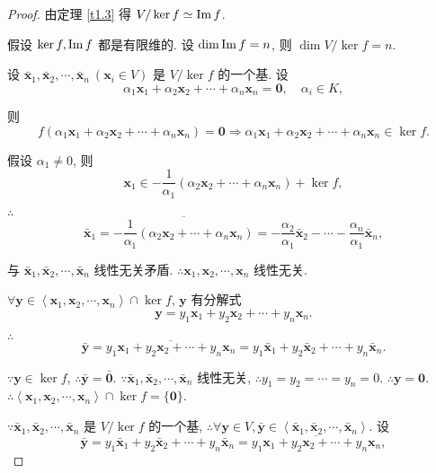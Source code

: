 \documentclass[color=black,device=normal,lang=cn,mode=geye]{elegantnote}
\begin{document}
\begin{proof}
    由定理 \ref{t1.3} 得 $V/\ker f\simeq\operatorname{Im} f$.

    假设 $\ker f,\operatorname{Im} f$ 都是有限维的. 设 $\dim\operatorname{Im} f=n$, 则 $\dim V/\ker f=n$.
    
    设 $\bar{\boldsymbol{x}}_1,\bar{\boldsymbol{x}}_2,\cdots,\bar{\boldsymbol{x}}_n\ (\boldsymbol{x}_i\in V)$ 是 $V/\ker f$ 的一个基. 设
    \[\alpha_1\boldsymbol{x}_1+\alpha_2\boldsymbol{x}_2+\cdots+\alpha_n\boldsymbol{x}_n=\boldsymbol{0},\quad\alpha_i\in K,\]

    则
    \[f(\alpha_1\boldsymbol{x}_1+\alpha_2\boldsymbol{x}_2+\cdots+\alpha_n\boldsymbol{x}_n)=\boldsymbol{0}\Rightarrow\alpha_1\boldsymbol{x}_1+\alpha_2\boldsymbol{x}_2+\cdots+\alpha_n\boldsymbol{x}_n\in\ker f.\]

    假设 $\alpha_1\neq0$, 则
    \[\boldsymbol{x}_1\in-\dfrac{1}{\alpha_1}(\alpha_2\boldsymbol{x}_2+\cdots+\alpha_n\boldsymbol{x}_n)+\ker f,\]

    $\therefore$
    \[\bar{\boldsymbol{x}}_1=\overline{-\dfrac{1}{\alpha_1}(\alpha_2\boldsymbol{x}_2+\cdots+\alpha_n\boldsymbol{x}_n)}=-\dfrac{\alpha_2}{\alpha_1}\bar{\boldsymbol{x}}_2-\cdots-\dfrac{\alpha_n}{\alpha_1}\bar{\boldsymbol{x}}_n,\]

    与 $\bar{\boldsymbol{x}}_1,\bar{\boldsymbol{x}}_2,\cdots,\bar{\boldsymbol{x}}_n$ 线性无关矛盾. $\therefore\boldsymbol{x}_1,\boldsymbol{x}_2,\cdots,\boldsymbol{x}_n$ 线性无关.

    $\forall\boldsymbol{y}\in\left<\boldsymbol{x}_1,\boldsymbol{x}_2,\cdots,\boldsymbol{x}_n\right>\cap\ker f$, $\boldsymbol{y}$ 有分解式
    \[\boldsymbol{y}=y_1\boldsymbol{x}_1+y_2\boldsymbol{x}_2+\cdots+y_n\boldsymbol{x}_n.\]

    $\therefore$
    \[\bar{\boldsymbol{y}}=\overline{y_1\boldsymbol{x}_1+y_2\boldsymbol{x}_2+\cdots+y_n\boldsymbol{x}_n}=y_1\bar{\boldsymbol{x}}_1+y_2\bar{\boldsymbol{x}}_2+\cdots+y_n\bar{\boldsymbol{x}}_n.\]

    $\because\boldsymbol{y}\in\ker f$, $\therefore\bar{\boldsymbol{y}}=\bar{\boldsymbol{0}}$. $\because\bar{\boldsymbol{x}}_1,\bar{\boldsymbol{x}}_2,\cdots,\bar{\boldsymbol{x}}_n$ 线性无关, $\therefore y_1=y_2=\cdots=y_n=0$. $\therefore\boldsymbol{y}=\boldsymbol{0}$. $\therefore\left<\boldsymbol{x}_1,\boldsymbol{x}_2,\cdots,\boldsymbol{x}_n\right>\cap\ker f=\{\boldsymbol{0}\}$.

    $\because\bar{\boldsymbol{x}}_1,\bar{\boldsymbol{x}}_2,\cdots,\bar{\boldsymbol{x}}_n$ 是 $V/\ker f$ 的一个基, $\therefore\forall\boldsymbol{y}\in V,\bar{\boldsymbol{y}}\in\left<\bar{\boldsymbol{x}}_1,\bar{\boldsymbol{x}}_2,\cdots,\bar{\boldsymbol{x}}_n\right>$. 设
    \[\bar{\boldsymbol{y}}=y_1\bar{\boldsymbol{x}}_1+y_2\bar{\boldsymbol{x}}_2+\cdots+y_n\bar{\boldsymbol{x}}_n=\overline{y_1\boldsymbol{x}_1+y_2\boldsymbol{x}_2+\cdots+y_n\boldsymbol{x}_n},\]


\end{proof}
\end{document}
